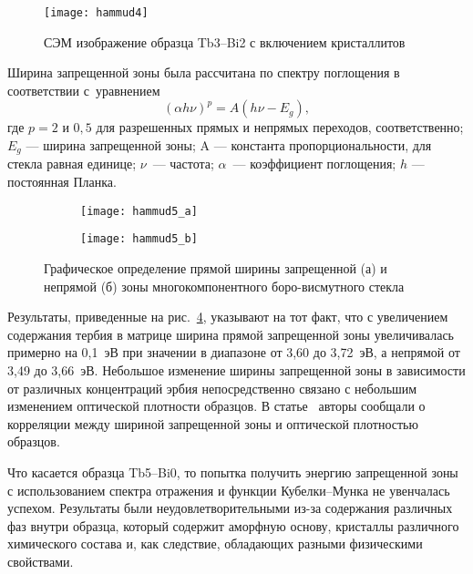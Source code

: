 \documentclass[press]{vestnik}
\begin{document}
\begin{figure}
\centerline{\texttt{[image: hammud4]}}
\caption{СЭМ изображение образца Tb3--Bi2 с включением кристаллитов}
\label{fig4}
\end{figure}

Ширина запрещенной зоны была рассчитана по спектру поглощения в соответствии 
с~уравнением~\cite{B15,B16}
\[
\left( \alpha h\nu \right)^{p}=A\left( h\nu -E_{g} \right),
\]
где $p=2$ и $0,5$ для разрешенных прямых и непрямых переходов, 
соответственно; $E_{g}$ --- ширина запрещенной зоны; A --- константа 
пропорциональности, для стекла равная единице; $\nu $~--- частота; $\alpha $~--- 
коэффициент поглощения; $h$ --- постоянная Планка.

\begin{figure}
\centering
\begin{subfigure}{.44\textwidth}
\texttt{[image: hammud5\_a]}
\caption{}\label{fig5a}
\end{subfigure}
\qquad
\begin{subfigure}{.44\textwidth}
\texttt{[image: hammud5\_b]}
\caption{}\label{fig5b}
\end{subfigure}
\caption{Графическое определение прямой ширины запрещенной (а) и непрямой (б) 
зоны многокомпонентного боро-висмутного стекла}
\label{fig5}
\end{figure}

Результаты, приведенные на рис.~\ref{fig5}, указывают на тот факт, что с увеличением 
содержания тербия в матрице ширина прямой запрещенной зоны увеличивалась 
примерно на 0,1~эВ при значении в диапазоне от 3,60 до 3,72~эВ, а непрямой 
от 3,49 до 3,66~эВ. Небольшое изменение ширины запрещенной зоны в 
зависимости от различных концентраций эрбия непосредственно связано с 
небольшим изменением оптической плотности образцов. В статье~\cite{B20} авторы 
сообщали о корреляции между шириной запрещенной зоны и оптической плотностью 
образцов.

Что касается образца Tb5--Bi0, то попытка получить энергию запрещенной зоны с 
использованием спектра отражения и функции Кубелки--Мунка не увенчалась 
успехом. Результаты были неудовлетворительными из-за содержания различных 
фаз внутри образца, который содержит аморфную основу, кристаллы различного 
химического состава и, как следствие, обладающих разными физическими 
свойствами.
\end{document}
